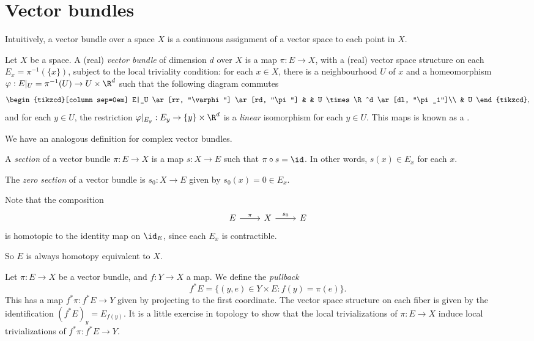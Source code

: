 \documentclass[a4paper]{article}
\begin{document}
\section{Vector bundles}
Intuitively, a vector bundle over a space $X$ is a continuous assignment of a vector space to each point in $X$.
\begin{defi}
  Let $X$ be a space. A (real) \emph{vector bundle} of dimension $d$ over $X$ is a map $\pi:E \to X$, with a (real) vector space structure on each  $E_x = \pi^{-1}(\{x\})$, subject to the local triviality condition: for each $x \in X$, there is a neighbourhood $U$ of $x$ and a homeomorphism $\varphi:E|_U = \pi^{-1}(U) \to U \times \R^d$ such that the following diagram commutes
  \[
    \begin{tikzcd}[column sep=0em]
      E|_U \ar[rr, "\varphi"] \ar[rd, "\pi"] & & U \times \R^d \ar[dl, "\pi_1"]\\
      & U
    \end{tikzcd},
  \]
  and for each $y \in U$, the restriction $\varphi|_{E_y}: E_y \to \{y\} \times \R^d$ is a \emph{linear} isomorphism for each $y \in U$. This maps is known as a .
\end{defi}
We have an analogous definition for complex vector bundles.

\begin{defi}[Section]
  A \emph{section} of a vector bundle $\pi: E \to X$ is a map $s: X \to E$ such that $\pi \circ s = \id$. In other words, $s(x) \in E_x$ for each $x$.
\end{defi}

\begin{defi}
  The \emph{zero section} of a vector bundle is $s_0: X \to E$ given by $s_0(x) = 0 \in E_x$.
\end{defi}

Note that the composition
\[
  \begin{tikzcd}
    E \ar[r, "\pi"] & X \ar[r, "s_0"] & E
  \end{tikzcd}
\]
is homotopic to the identity map on $\id_E$, since each $E_x$ is contractible.

So $E$ is always homotopy equivalent to $X$.

\begin{defi}
  Let $\pi: E \to X$ be a vector bundle, and $f: Y \to X$ a map. We define the \emph{pullback}
  \[
    f^* E = \{(y, e) \in Y \times E: f(y) = \pi(e)\}.
  \]
  This has a map $f^*\pi: f^*E \to Y$ given by projecting to the first coordinate. The vector space structure on each fiber is given by the identification $(f^*E)_y = E_{f(y)}$. It is a little exercise in topology to show that the local trivializations of $\pi: E \to X$ induce local trivializations of $f^*\pi: f^* E \to Y$.
\end{defi}
\end{document}
